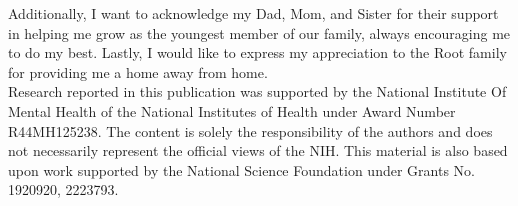 \documentclass[
12pt, %
oneside, %
english, %
singlespacing, %
liststotoc, %
headsepline, %
chapterinoneline, %
]{MastersDoctoralThesis} %
\begin{document}
\begin{acknowledgements}
Additionally, I want to acknowledge my Dad, Mom, and Sister for their support in helping me grow as the youngest member of our family, always encouraging me to do my best. Lastly, I would like to express my appreciation to the Root family for providing me a home away from home.\\

Research reported in this publication was supported by the National Institute Of Mental Health of the National Institutes of Health under Award Number R44MH125238. The content is solely the responsibility of the authors and does not necessarily represent the official views of the NIH. This material is also based upon work supported by the National Science Foundation under Grants No. 1920920, 2223793.

\end{acknowledgements}


%
%
%

{
  \hypersetup{linkcolor=black}
  \tableofcontents %
}

{
  \hypersetup{linkcolor=black}
  \listoffigures
}

{
  \hypersetup{linkcolor=black}
  \listoftables %
}


{
  \hypersetup{linkcolor=black}
  \listofalgorithms %
}

\end{document}
